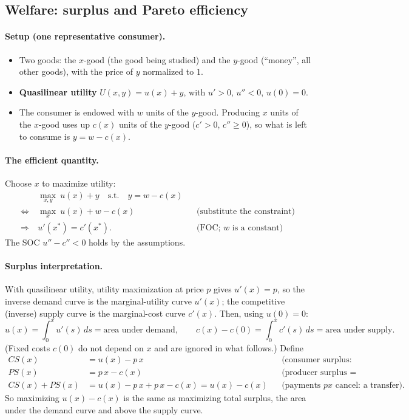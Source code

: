 \subsection{Welfare: surplus and Pareto efficiency }\label{sec:micro-welfare}

\paragraph{Setup (one representative consumer).}
\begin{itemize}
\item Two goods: the $x$-good (the good being studied) and the $y$-good (``money'', all other goods), with the price of $y$ normalized to $1$.
\item \textbf{Quasilinear utility} $U(x,y)=u(x)+y$, with $u'>0$, $u''<0$, $u(0)=0$.
\item The consumer is endowed with $w$ units of the $y$-good. Producing $x$ units of the $x$-good uses up $c(x)$ units of the $y$-good ($c'>0$, $c''\ge 0$), so what is left to consume is $y=w-c(x)$.
\end{itemize}

\paragraph{The efficient quantity.} Choose $x$ to maximize utility:
\begin{align*}
&\max_{x,y}\ u(x)+y\quad\text{s.t.}\quad y=w-c(x)\\
\Longleftrightarrow\ &\max_x\ u(x)+w-c(x) &&\text{(substitute the constraint)}\\
\Longrightarrow\ & u'(x^*)=c'(x^*). &&\text{(FOC; $w$ is a constant)}
\end{align*}
The SOC $u''-c''<0$ holds by the assumptions.

\paragraph{Surplus interpretation.} With quasilinear utility, utility maximization at price $p$ gives $u'(x)=p$, so the inverse demand curve is the marginal-utility curve $u'(x)$; the competitive (inverse) supply curve is the marginal-cost curve $c'(x)$. Then, using $u(0)=0$:
\[
u(x)=\int_0^x u'(s)\,ds=\text{area under demand},\qquad c(x)-c(0)=\int_0^x c'(s)\,ds=\text{area under supply}.
\]
(Fixed costs $c(0)$ do not depend on $x$ and are ignored in what follows.) Define
\begin{align*}
CS(x)&=u(x)-p\,x &&\text{(consumer surplus: value minus amount paid)}\\
PS(x)&=p\,x-c(x) &&\text{(producer surplus = profit)}\\
CS(x)+PS(x)&=u(x)-p\,x+p\,x-c(x)=u(x)-c(x) &&\text{(payments $px$ cancel: a transfer).}
\end{align*}
So maximizing $u(x)-c(x)$ is the same as maximizing total surplus, the area under the demand curve and above the supply curve.

